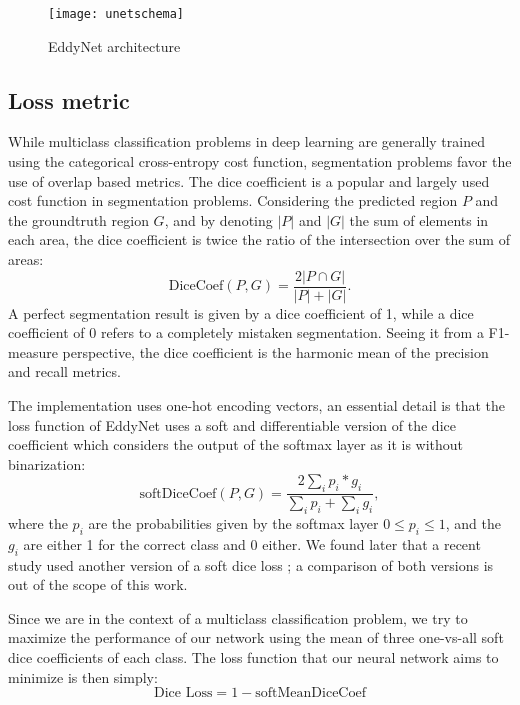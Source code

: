 \documentclass[journal]{IEEEtran}
\begin{document}
\begin{figure}[t]
\centering
\texttt{[image: unetschema]}
\caption{EddyNet architecture}
\label{fig:eddynet}
\end{figure}

\subsection{Loss metric}
While multiclass classification problems in deep learning are generally trained using the categorical cross-entropy cost function, segmentation problems favor the use of overlap based metrics. The dice coefficient is a popular and largely used cost function in segmentation problems. Considering the predicted region $P$ and the groundtruth region $G$, and by denoting $|P|$ and $|G|$ the sum of elements in each area, the dice coefficient is twice the ratio of the intersection over the sum of areas:
\begin{equation}
\text{DiceCoef}(P,G)=\frac{2 |P \cap G|}{|P|+ |G|}.
\end{equation}
 A perfect segmentation result is given by a dice coefficient of 1, while a dice coefficient of 0 refers to a completely mistaken segmentation. Seeing it from a F1-measure perspective, the dice coefficient is the harmonic mean of the precision and recall metrics.

The implementation uses one-hot encoding vectors, an essential detail is that the loss function of EddyNet uses a soft and differentiable version of the dice coefficient which considers the output of the softmax layer as it is without binarization:
\begin{equation}
\text{softDiceCoef}(P,G)=\frac{2 \sum_i p_i * g_i}{\sum_i p_i+ \sum_i g_i},
\end{equation}
where the $p_i$ are the probabilities given by the softmax layer $0\leq p_i \leq 1$, and the $g_i$ are either 1 for the correct class and 0 either. We found later that a recent study used another version of a soft dice loss \cite{milletari2016v}; a comparison of both versions is out of the scope of this work.

Since we are in the context of a multiclass classification problem, we try to maximize the performance of our network using the mean of three one-vs-all soft dice coefficients of each class. The loss function that our neural network aims to minimize is then simply:
\begin{equation}\label{eq:diceloss}
\text{Dice Loss}= 1 - \text{softMeanDiceCoef}
\end{equation}
\end{document}
